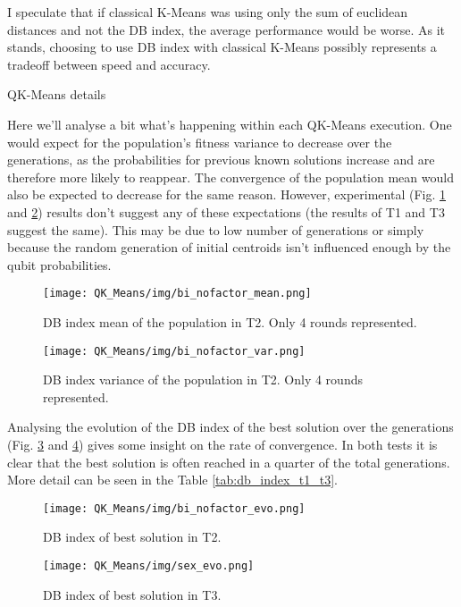 \documentclass[10pt,a4paper,final]{article}
\begin{document}
I speculate that if classical K-Means was using only the sum of euclidean distances and not the DB index, the average performance would be worse. As it stands, choosing to use DB index with classical K-Means possibly represents a tradeoff between speed and accuracy.

QK-Means details

Here we’ll analyse a bit what’s happening within each QK-Means execution. One would expect for the population’s fitness variance to decrease over the generations, as the probabilities for previous known solutions increase and are therefore more likely to reappear. The convergence of the population mean would also be expected to decrease for the same reason. However, experimental (Fig. \ref{fig:db_index_mean_t2} and \ref{fig:db_index_var_t2}) results don’t suggest any of these expectations (the results of T1 and T3 suggest the same). This may be due to low number of generations or simply because the random generation of initial centroids isn’t influenced enough by the qubit probabilities.


\begin{figure}[hbtp]
\centering
\texttt{[image: QK\_Means/img/bi\_nofactor\_mean.png]}
\caption{DB index mean of the population in T2. Only 4 rounds represented.}
\label{fig:db_index_mean_t2}
\end{figure}

\begin{figure}[hbtp]
\centering
\texttt{[image: QK\_Means/img/bi\_nofactor\_var.png]}
\caption{DB index variance of the population in T2. Only 4 rounds represented.}
\label{fig:db_index_var_t2}
\end{figure}


Analysing the evolution of the DB index of the best solution over the generations (Fig. \ref{fig:qk_db_index_best_evo_t2} and \ref{fig:qk_db_index_best_evo_t3}) gives some insight on the rate of convergence. In both tests it is clear that the best solution is often reached in a quarter of the total generations. More detail can be seen in the Table \ref{tab:db_index_t1_t3}.

\begin{figure}[hbtp]
\centering
\texttt{[image: QK\_Means/img/bi\_nofactor\_evo.png]}
\caption{DB index of best solution in T2.}
\label{fig:qk_db_index_best_evo_t2}
\end{figure}


\begin{figure}[hbtp]
\centering
\texttt{[image: QK\_Means/img/sex\_evo.png]}
\caption{DB index of best solution in T3.}
\label{fig:qk_db_index_best_evo_t3}
\end{figure}
\end{document}
